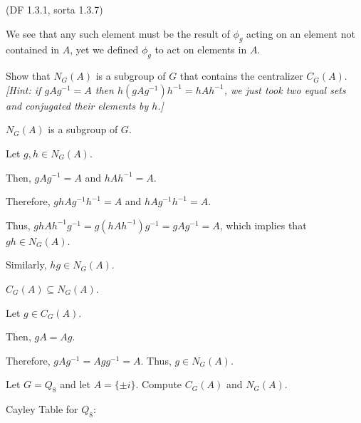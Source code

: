 \begin{problem}{\textsf{(DF 1.3.1, sorta 1.3.7)}}
\begin{enumalph}
\begin{Answer}
\begin{enumroman}
            \noindent
            We see that any such element must be the result of $\phi_g$
            acting on an element not contained in $A$, yet we defined $\phi_g$
            to act on elements in $A$.
        \end{enumroman}
      \end{Answer}

    \newpage
    \item Show that $N_G(A)$ is a subgroup of $G$ that contains the centralizer
      $C_G(A)$.
      \emph{[Hint: if $gAg^{-1}=A$ then $h(gAg^{-1})h^{-1} = hAh^{-1}$, we just took 
      two equal sets and conjugated their elements by $h$.]}
      \begin{Answer}
        \begin{enumroman}
          \item $N_G(A)$ is a subgroup of $G$.
            
            \noindent
            Let $g,h \in N_G(A)$.

            Then, $gAg^{-1} = A$ and $hAh^{-1} = A$.

            Therefore, $ghAg^{-1}h^{-1} = A$ and $hAg^{-1}h^{-1} = A$.

            Thus, $ghAh^{-1}g^{-1} = g(hAh^{-1}) g^{-1} = gAg^{-1} = A$, which implies that
            $gh \in N_G(A)$.

            Similarly, $hg \in N_G(A)$.
          \item $C_G(A) \subseteq N_G(A)$.
            
            \noindent
            Let $g \in C_G(A)$.

            Then, $gA = Ag$.

            Therefore, $gAg^{-1} = Agg^{-1} = A$.
            Thus, $g \in N_G(A)$.
        \end{enumroman}
      \end{Answer}
    \item Let $G=Q_8$ and let $A=\{\pm i\}$.  Compute $C_G(A)$ and $N_G(A)$.
    \begin{Answer}
      Cayley Table for $Q_8$:


\end{Answer}
\end{enumalph}
\end{problem}
